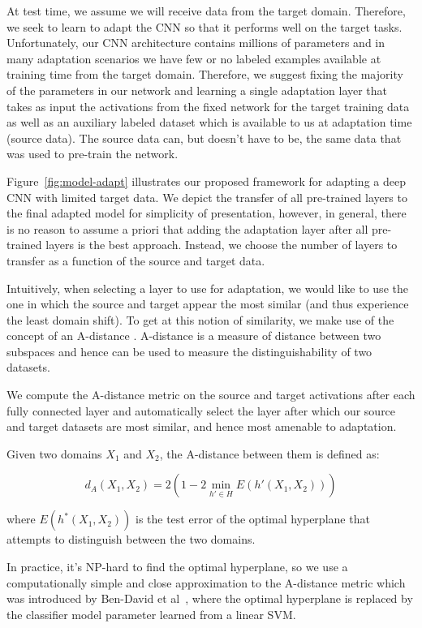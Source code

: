 At test time, we assume we will receive data from the target domain. Therefore, we seek to 
learn to adapt the CNN so that it performs well on the target tasks. Unfortunately,
our CNN architecture contains millions of parameters and in many adaptation 
scenarios we have few or no labeled examples available at training time from the
target domain. Therefore, we suggest fixing the majority of the parameters in our 
network and learning a single adaptation layer that takes as input
the activations from the fixed network for the target training data as well as an auxiliary labeled
dataset which is available to us at adaptation time (source data). The source data
can, but doesn't have to be, the same data that was used to pre-train the network.

Figure~\ref{fig:model-adapt} illustrates our proposed framework for adapting a deep CNN 
with limited target data. We depict the transfer of all pre-trained layers to the final adapted model 
for simplicity of presentation,  however, in general, there is no reason to assume a priori that 
adding the adaptation layer after all pre-trained layers is the best approach.  Instead, we choose
the number of layers to transfer as a function of the source and target data.

Intuitively, when selecting a layer to use for adaptation, we would like to use
the one in which the source and target appear the most similar (and thus
experience the least domain shift).
To get at this notion of similarity, we make use of the concept of an A-distance
\cite{adist}. A-distance is a measure of distance between two subspaces and hence 
can be used to measure the distinguishability of two datasets.

We compute the A-distance metric on the source and target activations after each fully 
connected layer 
and automatically select the  layer after which
our source and target datasets are most similar, and hence most amenable to adaptation.

Given two domains $X_1$ and $X_2$, the A-distance between them is defined as:

\begin{equation}
  d_A(X_1, X_2) = 2 \left( 1 - 2 \min_{h' \in H} E(h'(X_1, X_2))\right)
\end{equation}


where $E(h^*(X_1, X_2))$ is the test error of the optimal hyperplane that attempts to
distinguish between the two domains.

In practice, it's NP-hard to find the optimal hyperplane, so we use a computationally simple and 
close approximation to the A-distance metric which was introduced by Ben-David et al~\cite{adist-comp}, 
where the optimal hyperplane is replaced by the classifier model parameter learned from a linear SVM.

